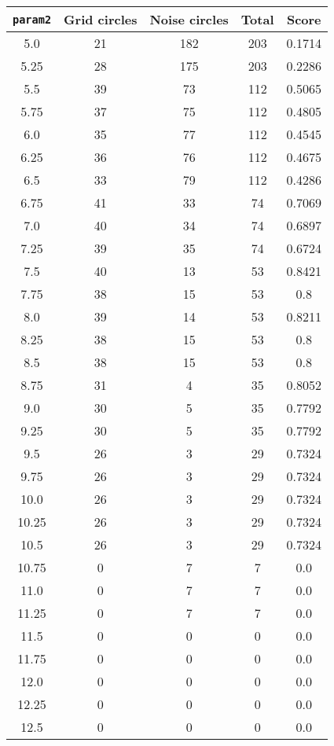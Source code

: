 \documentclass[letterpaper, 12pt]{article}
\begin{document}
\begin{longtable}{|c|c|c|c|c|}
\hline
\textbf{\texttt{param2}} & \textbf{Grid circles} & \textbf{Noise circles} & \textbf{Total} & \textbf{Score} \\
\hline
5.0 & 21 & 182 & 203 & 0.1714 \\
\hline
5.25 & 28 & 175 & 203 & 0.2286 \\
\hline
5.5 & 39 & 73 & 112 & 0.5065 \\
\hline
5.75 & 37 & 75 & 112 & 0.4805 \\
\hline
6.0 & 35 & 77 & 112 & 0.4545 \\
\hline
6.25 & 36 & 76 & 112 & 0.4675 \\
\hline
6.5 & 33 & 79 & 112 & 0.4286 \\
\hline
6.75 & 41 & 33 & 74 & 0.7069 \\
\hline
7.0 & 40 & 34 & 74 & 0.6897 \\
\hline
7.25 & 39 & 35 & 74 & 0.6724 \\
\hline
7.5 & 40 & 13 & 53 & 0.8421 \\
\hline
7.75 & 38 & 15 & 53 & 0.8 \\
\hline
8.0 & 39 & 14 & 53 & 0.8211 \\
\hline
8.25 & 38 & 15 & 53 & 0.8 \\
\hline
8.5 & 38 & 15 & 53 & 0.8 \\
\hline
8.75 & 31 & 4 & 35 & 0.8052 \\
\hline
9.0 & 30 & 5 & 35 & 0.7792 \\
\hline
9.25 & 30 & 5 & 35 & 0.7792 \\
\hline
9.5 & 26 & 3 & 29 & 0.7324 \\
\hline
9.75 & 26 & 3 & 29 & 0.7324 \\
\hline
10.0 & 26 & 3 & 29 & 0.7324 \\
\hline
10.25 & 26 & 3 & 29 & 0.7324 \\
\hline
10.5 & 26 & 3 & 29 & 0.7324 \\
\hline
10.75 & 0 & 7 & 7 & 0.0 \\
\hline
11.0 & 0 & 7 & 7 & 0.0 \\
\hline
11.25 & 0 & 7 & 7 & 0.0 \\
\hline
11.5 & 0 & 0 & 0 & 0.0 \\
\hline
11.75 & 0 & 0 & 0 & 0.0 \\
\hline
12.0 & 0 & 0 & 0 & 0.0 \\
\hline
12.25 & 0 & 0 & 0 & 0.0 \\
\hline
12.5 & 0 & 0 & 0 & 0.0 \\

\end{longtable}
\end{document}
